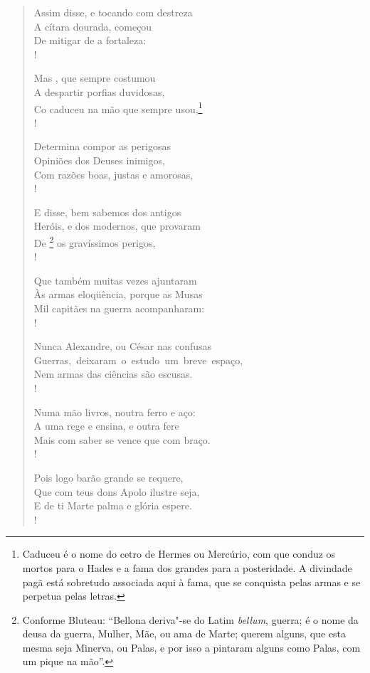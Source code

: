 \begin{verse}
Assim disse, e tocando com destreza\\
A cítara dourada, começou\\
De mitigar de  a fortaleza:\\!

Mas , que sempre costumou\\
A despartir porfias duvidosas,\\
Co caduceu na mão que sempre usou,\footnote{ Caduceu é o nome do cetro de
Hermes ou Mercúrio, com que conduz os mortos para o Hades e a fama dos
grandes para a posteridade. A divindade pagã está sobretudo associada
aqui à fama, que se conquista pelas armas e se perpetua pelas letras.}\\!

Determina compor as perigosas\\
Opiniões dos Deuses inimigos,\\
Com razões boas, justas e amorosas,\\! \EP[1]

E disse, bem sabemos dos antigos\\
Heróis, e dos modernos, que provaram\\
De \footnote{ Conforme Bluteau: ``Bellona deriva"-se do
Latim \textit{bellum}, guerra; é o nome da deusa da guerra, Mulher,
Mãe, ou ama de Marte; querem alguns, que esta mesma seja Minerva, ou
Palas, e por isso a pintaram alguns como Palas, com um pique na mão''.} os gravíssimos perigos,\\!

Que também muitas vezes ajuntaram\\
Às armas eloqüência, porque as Musas\\
Mil capitães na guerra acompanharam:\\!

Nunca Alexandre, ou César nas confusas\\ 	 
\mbox{Guerras, deixaram o estudo um breve espaço,}\\
\vspace{-3ex}Nem armas das ciências são escusas.\\!

Numa mão livros, noutra ferro e aço:\\
A uma rege e ensina, e outra fere\\
Mais com saber se vence que com braço.\\!

Pois logo barão grande se requere,\\
Que com teus dons Apolo ilustre seja,\\
E de ti Marte palma e glória espere.\\!


\end{verse}
